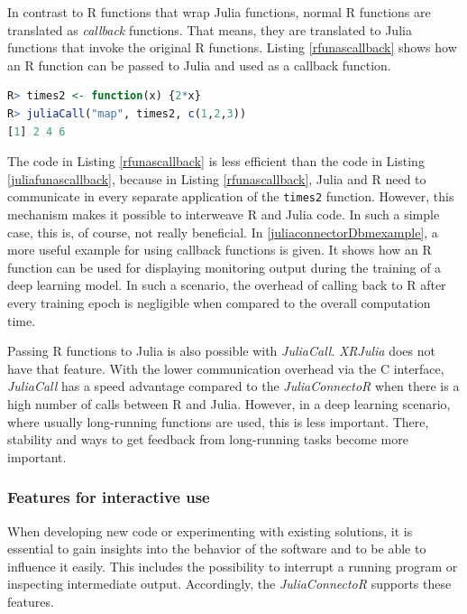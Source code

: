 \documentclass[12pt]{article}
\newcommand{\inlinecode}[1]{\texttt{#1}}
\newcommand{\apkg}[1]{\emph{#1}}
\begin{document}
In contrast to R functions that wrap Julia functions, normal R functions are translated as {\em callback} functions.
That means, they are translated to Julia functions that invoke the original R functions.
Listing \ref{rfunascallback} shows how an R function can be passed to Julia and used as a callback function.

\begin{lstlisting}[language=R, float =!h, caption={An R function used as a callback function}, label={rfunascallback}]
R> times2 <- function(x) {2*x}
R> juliaCall("map", times2, c(1,2,3))
[1] 2 4 6
\end{lstlisting}

The code in Listing \ref{rfunascallback} is less efficient than the code in Listing \ref{juliafunascallback}, because in Listing \ref{rfunascallback}, Julia and R need to communicate in every separate application of the \inlinecode{times2} function.
However, this mechanism makes it possible to interweave R and Julia code.
In such a simple case, this is, of course, not really beneficial.
In \ref{juliaconnectorDbmexample}, a more useful example for using callback functions is given.
It shows how an R function can be used for displaying monitoring output during the training of a deep learning model.
In such a scenario, the overhead of calling back to R after every training epoch is negligible when compared to the overall computation time.

Passing R functions to Julia is also possible with \apkg{JuliaCall}.
\apkg{XRJulia} does not have that feature. 
With the lower communication overhead via the C interface, \apkg{JuliaCall} has a speed advantage compared to the \apkg{JuliaConnectoR} when there is a high number of calls between R and Julia.
However, in a deep learning scenario, where usually long-running functions are used, this is less important.
There, stability and ways to get feedback from long-running tasks become more important.

\subsubsection{Features for interactive use}

When developing new code or experimenting with existing solutions, it is essential to gain insights into the behavior of the software and to be able to influence it easily.
This includes the possibility to interrupt a running program or inspecting intermediate output.
Accordingly, the \apkg{JuliaConnectoR} supports these features.
\end{document}

